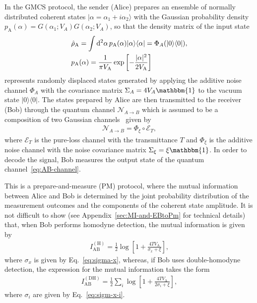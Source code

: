 \documentclass[%
reprint,
superscriptaddress,
 amsmath,amssymb,amsfonts,
 aps,
 pra,
 longbibliography
]{revtex4-2}
\newcommand{\ket}[1]{\ensuremath{|{#1}\rangle}}
\newcommand{\bra}[1]{\ensuremath{\langle{#1}|}}
\newcommand{\ind}[1]{\mathrm{#1}}
\newcommand{\dd}{\mathrm{d}}
\begin{document}
In the GMCS protocol,
the sender (Alice) prepares an ensemble of normally distributed coherent states
$\ket{\alpha=\alpha_1+i \alpha_2}$
with the Gaussian probability density
$p_{\ind{A}}(\alpha)=G(\alpha_1;V_A)G(\alpha_2;V_A)$,
so that the density matrix of the input state
\begin{align}
  \label{eq:ensemble}
  &
    \hat{\rho}_{\ind{A}}=\int\mathop{\dd^2\alpha} p_{\ind{A}}(\alpha)
    \ket{\alpha}\bra{\alpha}=\Phi_A(\ket{0}\bra{0}),
    \notag
\\
    &p_{\ind{A}}(\alpha)=\frac{1}{\pi V_{\ind{A}}}\exp\left[
    -\frac{|\alpha|^2}{2V_{\ind{A}}}
    \right]
\end{align}
represents randomly displaced states generated by
applying the additive noise channel $\Phi_A$ with the covariance matrix
$\Sigma_A= 4 V_A\mathbbm{1}$ to the vacuum state $\ket{0}\bra{0}$.
The states prepared by Alice are then transmitted to
the receiver (Bob)
through the quantum channel
$\mathcal{N}_{A\to B}$ which is assumed to be a composition
of two Gaussian channels~\cite{Laudenbach:aqt:2018}
given by
\begin{align}
  \label{eq:AB-channel}
  \mathcal{N}_{A\to B}=\Phi_{\xi}\circ\mathcal{E}_T,
\end{align}
where
$\mathcal{E}_T$ is the pure-loss channel with the transmittance $T$
and $\Phi_{\xi}$ is the additive noise channel  with
the noise covariance matrix $\Sigma_{\xi}=\xi \mathbbm{1}$.
In order to decode the signal,
Bob measures the output state of the quantum channel~\eqref{eq:AB-channel}.


This is  a prepare-and-measure (PM) protocol,
where
the mutual information between Alice and Bob
is determined by
the joint probability distribution of
the measurement outcomes and the components of the coherent state
amplitude.
It is not difficult to show
(see Appendix~\ref{sec:MI-and-EBtoPm} for technical details)
that, when Bob performs homodyne detection,
the mutual information is given by
\begin{align}
  \label{eq:I_H_res}
  I_{\ind{AB}}^{(\ind{H})}=\frac{1}{2}\log\left[1+\frac{4TV_{\ind{A}}}{\sigma_x+\xi}\right],
\end{align}
where $\sigma_x$ is given by Eq.~\eqref{eq:sigma-x},
whereas, if Bob uses double-homodyne detection, the expression for
the mutual information takes the form
\begin{align}
  \label{eq:I_DH_res}
  I_{\ind{AB}}^{(\ind{DH})}=\frac{1}{2}\sum_i\log\left[1+\frac{4TV_{\ind{A}}}
    {2 \sigma_i+\xi}\right],
\end{align}
where $\sigma_i$ are given by Eq.~\eqref{eq:sigm-x-i}.
\end{document}
